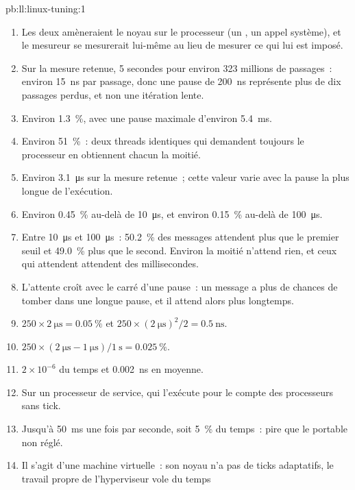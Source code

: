 \begin{solution}{pb:ll:linux-tuning:1}
\begin{enumerate}
\item Les deux amèneraient le noyau sur le processeur (un , un appel système), et le mesureur se mesurerait
lui-même au lieu de mesurer ce qui lui est imposé.
\item Sur la mesure retenue, 5 secondes pour environ 323 millions de passages~: environ \qty{15}{\nano\second} par passage, donc
une pause de \qty{200}{\nano\second} représente plus de dix passages perdus, et non une itération lente.
\item Environ 1.3~\%, avec une pause maximale d'environ \qty{5.4}{\milli\second}.
\item Environ 51~\%~: deux threads identiques qui demandent toujours le processeur en obtiennent chacun la moitié.
\item Environ \qty{3.1}{\micro\second} sur la mesure retenue~; cette valeur varie avec la pause la plus longue de l'exécution.
\item Environ 0.45~\% au-delà de \qty{10}{\micro\second}, et environ 0.15~\% au-delà de \qty{100}{\micro\second}.
\item Entre \qty{10}{\micro\second} et \qty{100}{\micro\second}~: 50.2~\% des messages attendent plus que le premier seuil et
49.0~\% plus que le second. Environ la moitié n'attend rien, et ceux qui attendent attendent des millisecondes.
\item L'attente croît avec le carré d'une pause~: un message a plus de chances de tomber dans une longue pause, et il attend alors plus longtemps.
\item $250 \times \qty{2}{\micro\second} = 0.05~\%$ et $250 \times (\qty{2}{\micro\second})^2 / 2 = \qty{0.5}{\nano\second}$.
\item $250 \times (\qty{2}{\micro\second} - \qty{1}{\micro\second}) / \qty{1}{\second} = 0.025~\%$.
\item $2 \times 10^{-6}$ du temps et \qty{0.002}{\nano\second} en moyenne.
\item Sur un processeur de service, qui l'exécute pour le compte des processeurs sans tick.
\item Jusqu'à \qty{50}{\milli\second} une fois par seconde, soit 5~\% du temps~: pire que le portable non réglé.
\item Il s'agit d'une machine virtuelle~: son noyau n'a pas de ticks adaptatifs, le travail propre de l'hyperviseur vole du temps

\end{enumerate}
\end{solution}
